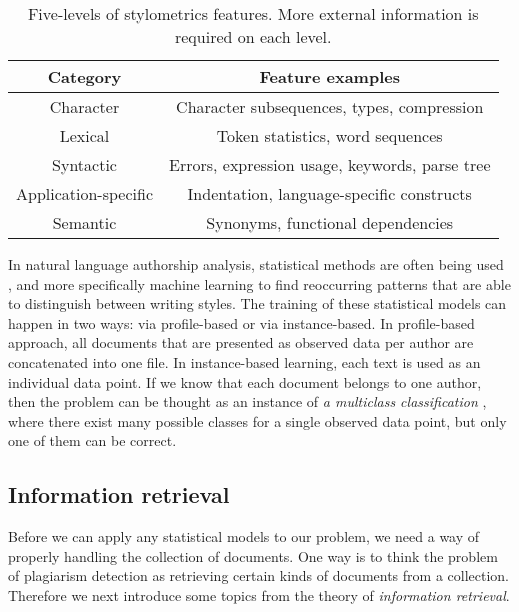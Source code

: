 \begin{table}[ht]
\centering
\caption{Five-levels of stylometrics features. More external information is required on each level.}
\label{tbl-ai-stylomet}
\begin{tabular}{|c|c|} \hline
\textbf{Category}             & \textbf{Feature examples} \\ \hline
Character            & Character subsequences, types, compression            \\
Lexical              & Token statistics, word sequences                   \\
Syntactic            & Errors, expression usage, keywords, parse tree        \\
Application-specific & Indentation, language-specific constructs \\ 
Semantic             & Synonyms, functional dependencies                \\\hline
\end{tabular}
\end{table}

In natural language authorship analysis, statistical methods are often being used \cite{Stamatatos:2009:SMA:1527090.1527102}, and more specifically machine learning to find reoccurring patterns that are able to distinguish between writing styles. The training of these statistical models can happen in two ways: via profile-based or via instance-based. In profile-based approach, all documents that are presented as observed data per author are concatenated into one file. In instance-based learning, each text is used as an individual data point. If we know that each document belongs to one author, then the problem can be thought as an instance of \emph{a multiclass classification} \cite{Stamatatos:2009:SMA:1527090.1527102}, where there exist many possible classes for a single observed data point, but only one of them can be correct.



\subsection{Information retrieval} \label{chap-IR}

Before we can apply any statistical models to our problem, we need a way of properly handling the collection of documents. One way is to think the problem of plagiarism detection as retrieving certain kinds of documents from a collection. Therefore we next introduce some topics from the theory of \emph{information retrieval}.

